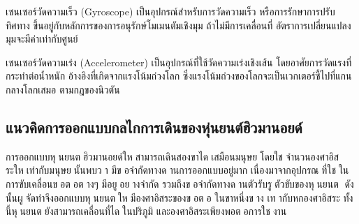 เซนเซอร์วัดความเร็ว (Gyroscope) เป็นอุปกรณ์สำหรับการวัดความเร็ว หรือการรักษาการปรับทิศทาง ขึ้นอยู่กับหลักการของการอนุรักษ์โมเมนตัมเชิงมุม
ถ้าไม่มีการเคลื่อนที่ อัตราการเปลี่ยนแปลงมุมจะมีค่าเท่ากับศูนย์

เซนเซอร์วัดความเร่ง (Accelerometer) เป็นอุปกรณ์ที่ใช้วัดความเร่งเชิงเส้น โดยอาศัยการวัดแรงที่กระทำต่อน้ำหนัก
อ้างอิงที่เกิดจากแรงโน้มถ่วงโลก ซึ่งแรงโน้มถ่วงของโลกจะเป็นเวกเตอร์ชี้ไปที่แกนกลางโลกเสมอ ตามกฎของนิวตัน

\subsection{แนวคิดการออกแบบกลไกการเดินของหุ่นยนต์ฮิวมานอยด์}
การออกแบบหุนยนตฮิวมานอยด์ใหสามารถเดินสองขาไดเสมือนมนุษยโดยใชจํานวนองศาอิสระใหเท่ากับมนุษยนั้นพบวา
มีขอจํากัดทางดานการออกแบบอยู่มาก เนื่องมาจากอุปกรณที่ใชในการขับเคลื่อนขอตอตางๆ มีอยูอยางจํากัด
รวมถึงขอจํากัดทางดานตัวรับรูตัวขับของหุนยนต ดังนั้นผูจัดทําจึงออกแบบหุนยนตใหมีองศาอิสระของขอตอ ในขาหนึ่งขาง
เทากับหกองศาอิสระ ทั้งนี้หุนยนตยังสามารถเคลื่อนที่ไดในปริภูมิ และองศาอิสระเพียงพอตอการใชงาน